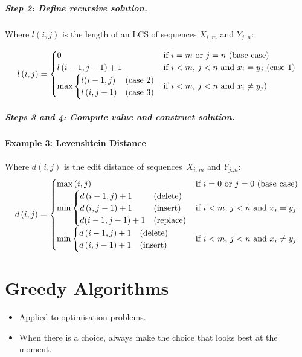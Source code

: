 \documentclass[twocolumn,english]{article}
\begin{document}
\subparagraph{Step 2: Define recursive solution.}

Where $l\left(i,j\right)$ is the length of an LCS of sequences $X_{i..m}$
and $Y_{j..n}$:

\[
l\left(i,j\right)=\begin{cases}
0 & \text{if \ensuremath{i=m} or \ensuremath{j=n} (base case)}\\
l\left(i-1,j-1\right)+1 & \text{if \ensuremath{i<m}, \ensuremath{j<n} and \ensuremath{x_{i}=y_{j}} (case 1)}\\
\max\begin{cases}
l(i-1,j) & \text{(case 2)}\\
l\left(i,j-1\right) & \text{(case 3)}
\end{cases} & \text{if \ensuremath{i<m}, \ensuremath{j<n} and \ensuremath{x_{i}\neq y_{j}})}
\end{cases}
\]

\subparagraph{Steps 3 and 4: Compute value and construct solution.}

\paragraph{Example 3: Levenshtein Distance}

Where $d\left(i,j\right)$ is the edit distance of sequences~$X_{i..m}$
and $Y_{j..n}$:
\[
d\left(i,j\right)=\begin{cases}
\max\left(i,j\right) & \text{if \ensuremath{i=0} or \ensuremath{j=0} (base case)}\\
\min\begin{cases}
d\left(i-1,j\right)+1 & \text{(delete)}\\
d\left(i,j-1\right)+1 & \text{(insert)}\\
d(i-1,j-1)+1 & \text{(replace)}
\end{cases} & \text{if \ensuremath{i<m}, \ensuremath{j<n} and \ensuremath{x_{i}=y_{j}}}\\
\min\begin{cases}
d\left(i-1,j\right)+1 & \text{(delete)}\\
d\left(i,j-1\right)+1 & \text{(insert)}
\end{cases} & \text{if \ensuremath{i<m}, \ensuremath{j<n} and \ensuremath{x_{i}\neq y_{j}}}
\end{cases}
\]

\section{Greedy Algorithms}
\begin{itemize}
\item Applied to optimisation problems.
\item When there is a choice, always make the choice that looks best at
the moment.
\end{itemize}
\end{document}
